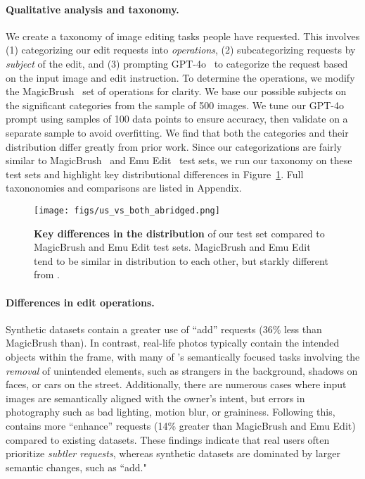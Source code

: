 \paragraph{Qualitative analysis and taxonomy.} %
We create a taxonomy of image editing tasks people have requested. This involves (1) categorizing our edit requests into \textit{operations}, (2) subcategorizing requests by \textit{subject} of the edit, and (3) prompting GPT-4o~\cite{openai2023gpt4} to categorize the request based on the input image and edit instruction. To determine the operations, we modify the MagicBrush~\cite{zhang2024magicbrush} set of operations for clarity. We base our possible subjects on the significant categories from the sample of 500 images. We tune our GPT-4o prompt using samples of 100 data points to ensure accuracy, then validate on a separate sample to avoid overfitting. We find that both the categories and their distribution differ greatly from prior work. Since our categorizations are fairly similar to MagicBrush~\cite{zhang2024magicbrush} and Emu Edit~\cite{sheynin2024emu} test sets, we run our taxonomy on these test sets and highlight key distributional differences in Figure~\ref{fig:dist_us_both}. Full taxononomies and comparisons are listed in Appendix.

\begin{figure}[t]
    \centering
    \texttt{[image: figs/us\_vs\_both\_abridged.png]}
    \caption{\textbf{Key differences in the distribution} of our test set compared to MagicBrush and Emu Edit test sets. MagicBrush and Emu Edit tend to be similar in distribution to each other, but starkly different from \RealEdit.}
    \label{fig:dist_us_both}
    \vspace{-4mm}
\end{figure}

\paragraph{Differences in edit operations.}
Synthetic datasets contain a greater use of ``add'' requests (36\% less than MagicBrush than). In contrast, real-life photos typically contain the intended objects within the frame, with many of \RealEdit's semantically focused tasks involving the \textit{removal} of unintended elements, such as strangers in the background, shadows on faces, or cars on the street.
Additionally, there are numerous cases where input images are semantically aligned with the owner's intent, but errors in photography such as bad lighting, motion blur, or graininess.
Following this, \RealEdit contains more ``enhance'' requests (14\% greater than MagicBrush and Emu Edit) compared to existing datasets. These findings indicate that real users often prioritize \textit{subtler requests}, whereas synthetic datasets are dominated by larger semantic changes, such as ``add."

